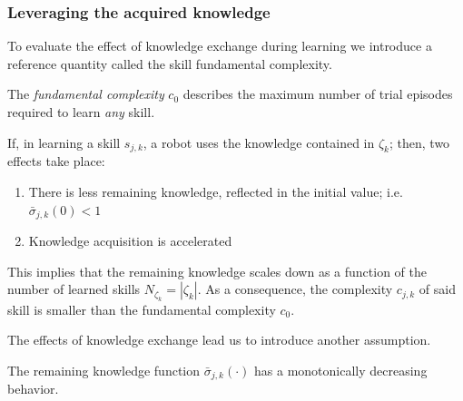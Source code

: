 \subsubsection{\textbf{Leveraging the acquired knowledge}}
To evaluate the effect of knowledge exchange during learning we introduce a reference quantity called the skill fundamental complexity.
\begin{tcolorbox}
	\begin{definition}\label{assumption:fundamental_complexity}
		The \emph{fundamental complexity} $c_0$ describes the maximum number of trial episodes required to learn \emph{any} skill.
	\end{definition}
\end{tcolorbox}
If, in learning a skill $ s_{j,k} $, a robot uses the knowledge contained in $\mathcal{\zeta}_k$; then, two effects take place:
\begin{enumerate}
	\item There is less remaining knowledge, reflected in the initial value; i.e. $\bar{\sigma}_{j,k}(0) < 1$
	\item Knowledge acquisition is accelerated
\end{enumerate}
This implies that the remaining knowledge scales down as a function of the number of learned skills $N_{\zeta_k}=|\mathcal{\zeta}_k|$. As a consequence, the complexity $c_{j,k}$ of said skill is smaller than the fundamental complexity $c_0$.%

The effects of knowledge exchange lead us to introduce another assumption.
\begin{tcolorbox}
	\begin{assumption}\label{assumption:exponential_decrease} The remaining knowledge function $\bar{\sigma}_{j,k}(\cdot)$ has a monotonically decreasing behavior.
	\end{assumption}
\end{tcolorbox} 
\noindent

